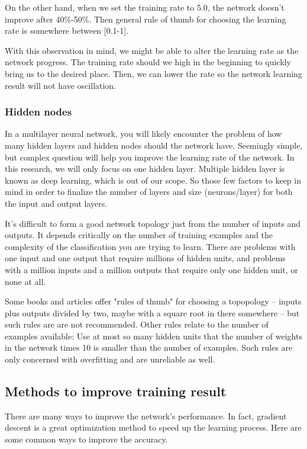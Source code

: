 \documentclass[]{article}
\begin{document}
\begin{multicols}{2}
On the other hand, when we set the training rate to 5.0, the network doesn't improve after 40\%-50\%. Then general rule of thumb for choosing the learning rate is somewhere between [0.1-1]. 

With this observation in mind, we might be able to alter the learning rate as the network progress. The training rate should we high in the beginning to quickly bring us to the desired place. Then, we can lower the rate so the network learning result will not have oscillation.  
\subsubsection{Hidden nodes}
In a multilayer neural network, you will likely encounter the problem of how many hidden layers and hidden nodes should the network have. Seemingly simple, but complex question will help you improve the learning rate of the network. In this research, we will only focus on one hidden layer. Multiple hidden layer is known as deep learning, which is out of our scope. 
So those few factors to keep in mind in order to finalize the number of layers and size (neurons/layer) for both the input and output layers. 

It's difficult to form a good network topology just from the number of inputs and outputs. It depends critically on the number of training examples and the complexity of the classification you are trying to learn. There are problems with one input and one output that require millions of hidden units, and problems with a million inputs and a million outputs that require only one hidden unit, or none at all.

Some books and articles offer "rules of thumb" for choosing a topopology -- inputs plus outputs divided by two, maybe with a square root in there somewhere -- but such rules are are not recommended. Other rules relate to the number of examples available: Use at most so many hidden units that the number of weights in the network times 10 is smaller than the number of examples. Such rules are only concerned with overfitting and are unreliable as well.

\subsection{Methods to improve training result}

There are many ways to improve the network's performance. In fact, gradient descent is a great optimization method to speed up the learning process. Here are some common ways to improve the accuracy. 


\end{multicols}
\end{document}
